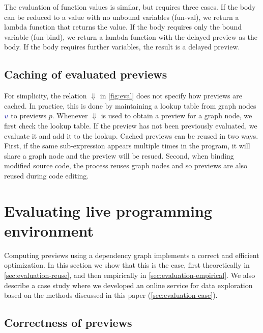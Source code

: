 \documentclass[english,crc,references=cleveref]{programming}
\theoremstyle{plain}
\theoremstyle{definition}
\newcommand{\bndclr}[1]{\textcolor{kvdclr}{#1}}
\newcommand{\rname}[1]{{\sffamily(#1)}}
\begin{document}
The evaluation of function values is similar, but requires three cases. If the body can
be reduced to a value with no unbound variables \rname{fun-val}, we return a lambda function that
returns the value. If the body requires only the bound variable \rname{fun-bind}, we return a
lambda function with the delayed preview as the body. If the body requires further variables,
the result is a delayed preview.

\subsection{Caching of evaluated previews}
\label{sec:previews-cache}

For simplicity, the relation $\Downarrow$ in \cref{fig:eval} does not specify how previews
are cached. In practice, this is done by maintaining a lookup table from graph nodes $\bndclr{v}$
to previews $p$. Whenever $\Downarrow$ is used to obtain a preview for a graph node, we first
check the lookup table. If the preview has not been previously evaluated, we evaluate it and add
it to the lookup. Cached previews can be reused in two ways. First, if the same sub-expression
appears multiple times in the program, it will share a graph node and the preview will be resued.
Second, when binding modified source code, the process reuses graph nodes and so previews are
also reused during code editing.


\section{Evaluating live programming environment}
\label{sec:evaluation}

Computing previews using a dependency graph implements a correct and efficient optimization.
In this section we show that this is the case, first theoretically in \cref{sec:evaluation-reuse},
and then empirically in \cref{sec:evaluation-empirical}. We also describe a case study where
we developed an online service for data exploration based on the methods discussed in this paper
(\cref{sec:evaluation-case}).


\subsection{Correctness of previews}
\label{sec:evaluation-correctness}
\end{document}

